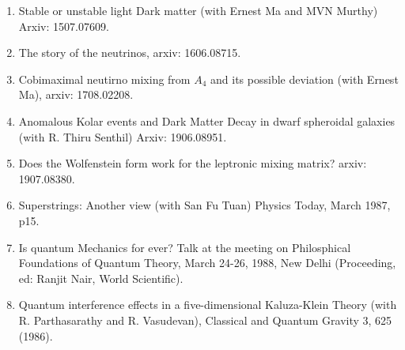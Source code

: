 \begin{enumerate}
\item Stable or unstable light Dark matter (with Ernest Ma and MVN Murthy) Arxiv: 1507.07609.

\item The story of the neutrinos, arxiv: 1606.08715.

\item Cobimaximal neutirno mixing from $A_4$ and its possible deviation (with Ernest Ma), arxiv: 1708.02208.

\item Anomalous Kolar events and Dark Matter Decay in dwarf spheroidal galaxies (with R. Thiru Senthil) Arxiv: 1906.08951.

\item Does the Wolfenstein form work for the leptronic mixing matrix? arxiv: 1907.08380.

\item Superstrings: Another view (with San Fu Tuan) Physics Today, March 1987, p15.

\item Is quantum Mechanics for ever? Talk at the meeting on Philosphical Foundations of Quantum Theory, March 24-26, 1988, New Delhi (Proceeding, ed: Ranjit Nair, World Scientific).

\item Quantum interference effects in a five-dimensional Kaluza-Klein Theory (with R. Parthasarathy and R. Vasudevan), Classical and Quantum Gravity 3, 625 (1986).

\end{enumerate}  
